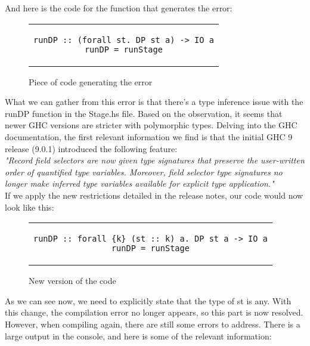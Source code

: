 And here is the code for the function that generates the error:

\begin{figure}[H]
    \begin{tabular}{c}
        \begin{lstlisting}
runDP :: (forall st. DP st a) -> IO a
runDP = runStage
        \end{lstlisting}
    \end{tabular}
    \caption[{[Code]} runDP error]{Piece of code generating the error}
    \label{fig:HC26}
\end{figure}
What we can gather from this error is that there's a type inference issue with the runDP function in the Stage.hs file.
Based on the observation, it seems that newer GHC versions are stricter with polymorphic types.
Delving into the GHC documentation, the first relevant information we find is that the initial GHC 9 release (9.0.1) introduced the following feature: \cite*[][Point 2.1.2.1]{} \\

\textit{"Record field selectors are now given type signatures that preserve the user-written order of quantified type variables.
Moreover, field selector type signatures no longer make inferred type variables available for explicit type application."}  \\

If we apply the new restrictions detailed in the release notes, our code would now look like this:

\begin{figure}[H]
    \begin{tabular}{c}
        \begin{lstlisting}
runDP :: forall {k} (st :: k) a. DP st a -> IO a
runDP = runStage
        \end{lstlisting}
    \end{tabular}
    \caption[{[Code]} New runDP definition]{New version of the code}
    \label{fig:HC27}
\end{figure}

As we can see now, we need to explicitly state that the type of st is any.
With this change, the compilation error no longer appears, so this part is now resolved.
However, when compiling again, there are still some errors to address.
There is a large output in the console, and here is some of the relevant information:

